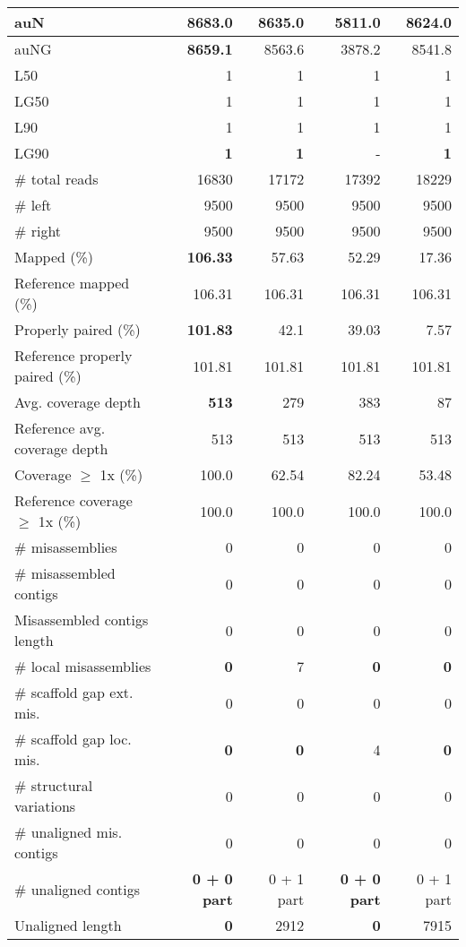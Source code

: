 \documentclass[12pt,a4paper]{article}
\begin{document}
\begin{table}[ht]
\begin{center}
\begin{tabular}{|l*{4}{|r}|}
auN & {\bf 8683.0} & 8635.0 & 5811.0 & 8624.0 \\ \hline
auNG & {\bf 8659.1} & 8563.6 & 3878.2 & 8541.8 \\ \hline
L50 & 1 & 1 & 1 & 1 \\ \hline
LG50 & 1 & 1 & 1 & 1 \\ \hline
L90 & 1 & 1 & 1 & 1 \\ \hline
LG90 & {\bf 1} & {\bf 1} & - & {\bf 1} \\ \hline
\# total reads & 16830 & 17172 & 17392 & 18229 \\ \hline
\# left & 9500 & 9500 & 9500 & 9500 \\ \hline
\# right & 9500 & 9500 & 9500 & 9500 \\ \hline
Mapped (\%) & {\bf 106.33} & 57.63 & 52.29 & 17.36 \\ \hline
Reference mapped (\%) & 106.31 & 106.31 & 106.31 & 106.31 \\ \hline
Properly paired (\%) & {\bf 101.83} & 42.1 & 39.03 & 7.57 \\ \hline
Reference properly paired (\%) & 101.81 & 101.81 & 101.81 & 101.81 \\ \hline
Avg. coverage depth & {\bf 513} & 279 & 383 & 87 \\ \hline
Reference avg. coverage depth & 513 & 513 & 513 & 513 \\ \hline
Coverage $\geq$ 1x (\%) & 100.0 & 62.54 & 82.24 & 53.48 \\ \hline
Reference coverage $\geq$ 1x (\%) & 100.0 & 100.0 & 100.0 & 100.0 \\ \hline
\# misassemblies & 0 & 0 & 0 & 0 \\ \hline
\# misassembled contigs & 0 & 0 & 0 & 0 \\ \hline
Misassembled contigs length & 0 & 0 & 0 & 0 \\ \hline
\# local misassemblies & {\bf 0} & 7 & {\bf 0} & {\bf 0} \\ \hline
\# scaffold gap ext. mis. & 0 & 0 & 0 & 0 \\ \hline
\# scaffold gap loc. mis. & {\bf 0} & {\bf 0} & 4 & {\bf 0} \\ \hline
\# structural variations & 0 & 0 & 0 & 0 \\ \hline
\# unaligned mis. contigs & 0 & 0 & 0 & 0 \\ \hline
\# unaligned contigs & {\bf 0 + 0 part} & 0 + 1 part & {\bf 0 + 0 part} & 0 + 1 part \\ \hline
Unaligned length & {\bf 0} & 2912 & {\bf 0} & 7915 \\ \hline

\end{tabular}
\end{center}
\end{table}
\end{document}
